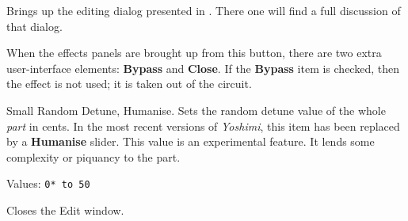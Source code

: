    Brings up the editing dialog presented in
   .
   There one will find a full discussion of that dialog.

   When the effects panels are brought up from this button, there are two extra
   user-interface elements:
   \textbf{Bypass} and \textbf{Close}.
   If the \textbf{Bypass} item is checked, then the effect is not
   used; it is taken out of the circuit.

   Small Random Detune, Humanise.
   Sets the random detune value of the whole \textsl{part} in
   cents.
   In the most recent versions of \textsl{Yoshimi}, this
   item has been replaced by a \textbf{Humanise} slider.
   This value is an experimental feature.  It lends some complexity or
   piquancy to the part.

   Values: \texttt{0* to 50}

   Closes the Edit window.

